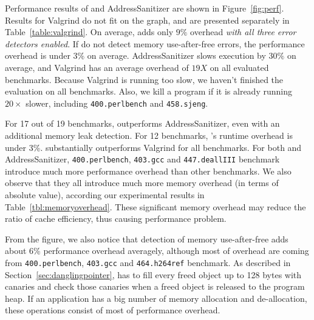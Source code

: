Performance results of \doubletake{} and AddressSanitizer are shown in Figure~\ref{fig:perf}. Results for Valgrind do not fit on the graph, and are presented separately in Table~\ref{table:valgrind}. On average, \doubletake{} adds only $9\%$ overhead \emph{with all three error detectors enabled}. If \doubletake{} do not detect memory use-after-free errors, the performance overhead is under 3\% on average. AddressSanitizer slows execution by $30\%$ on average, and Valgrind has an average overhead of $19X$ on all evaluated benchmarks. Because Valgrind is running too slow, we haven't finished the evaluation on all benchmarks. Also, we kill a program if it is already running $20\times$ slower, including \texttt{400.perlbench} and \texttt{458.sjeng}. 

For 17 out of 19 benchmarks, \doubletake{} outperforms AddressSanitizer, even with an additional memory leak detection. For 12 benchmarks, \doubletake{}'s runtime overhead is under 3\%. \doubletake{} substantially outperforms Valgrind for all benchmarks. For both \doubletake{} and AddressSanitizer,  \texttt{400.perlbench}, \texttt{403.gcc} and \texttt{447.deallIII} benchmark introduce much more performance overhead than other benchmarks. We also observe that they all introduce much more memory overhead (in terms of absolute value), according our experimental results in Table~\ref{tbl:memoryoverhead}. These significant memory overhead may reduce the ratio of cache efficiency, thus causing performance problem. 

From the figure, we also notice that detection of memory use-after-free adds about 6\% performance overhead averagely, although most of overhead are coming from \texttt{400.perlbench}, \texttt{403.gcc} and \texttt{464.h264ref} benchmark. As described in Section~\ref{sec:danglingpointer}, \doubletake{} has to fill every freed object up to 128 bytes with canaries and check those canaries when a freed object is released to the program heap. If an application has a big number of memory allocation and de-allocation, these operations consist of most of performance overhead. 

